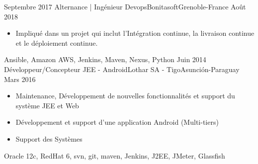 \begin{experiences}
  \emptySeparator
  \experience
    {Septembre 2017}   {Alternance | Ingénieur Devops}{Bonitasoft}{Grenoble-France}
    {Août 2018} {
                      \begin{itemize}
                        \item Impliqué dans un projet qui inclut l'Intégration continue, la livraison continue et le déploiement continue.
                      \end{itemize}
                    }
                    {Ansible, Amazon AWS, Jenkins, Maven, Nexus, Python}
  \emptySeparator
  \experience
    {Juin 2014}   {Développeur/Concepteur JEE - Android}{Lothar SA - Tigo}{Asunción-Paraguay}
    {Mars 2016} {
                      \begin{itemize}
                        \item Maintenance, Développement de nouvelles fonctionnalités et support du système JEE et Web
                        \item Développement et support d'une application Android (Multi-tiers)
                        \item Support des Systèmes
                      \end{itemize}

				}{Oracle 12c, RedHat 6, svn, git, maven, Jenkins, J2EE, JMeter, Glassfish}
  \emptySeparator


\end{experiences}
